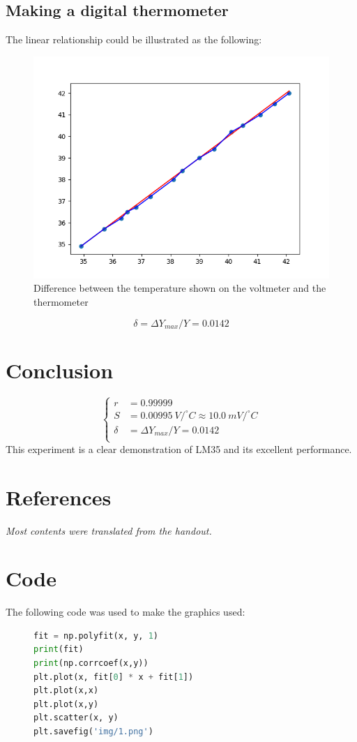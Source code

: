 \documentclass[a4paper]{article}
\begin{document}
\begin{multicols*}{2}
  \subsection*{Making a digital thermometer}
  The linear relationship could be illustrated as the following:
  \begin{figure}[H]
    \centering
    \includegraphics[width=0.8\linewidth]{./img/2.png}
    \caption{Difference between the temperature shown on the voltmeter and the thermometer}
    \label{fig:figure2}
  \end{figure}
  \begin{equation*}
    \delta = \Delta Y_{max} / Y = 0.0142
  \end{equation*}
  \section*{Conclusion}
  \begin{equation*}
    \left\{
    \begin{aligned}
      r      & = 0.99999                                       \\
      S      & = 0.00995\ V/^\circ C \approx 10.0\ mV/^\circ C \\
      \delta & = \Delta Y_{max} / Y = 0.0142                   \\
    \end{aligned}
    \right.
  \end{equation*}
  This experiment is a clear demonstration of LM35 and its excellent performance.
  \section*{References}
  \textit{Most contents were translated from the handout.}
  \section*{Code}
  The following code was used to make the graphics used:
  \begin{figure}[H]
    \centering
    \begin{lstlisting}[language=Python]
fit = np.polyfit(x, y, 1)
print(fit)
print(np.corrcoef(x,y))
plt.plot(x, fit[0] * x + fit[1])
plt.plot(x,x)
plt.plot(x,y)
plt.scatter(x, y)
plt.savefig('img/1.png')
\end{lstlisting}
  \end{figure}
\end{multicols*}
\end{document}
